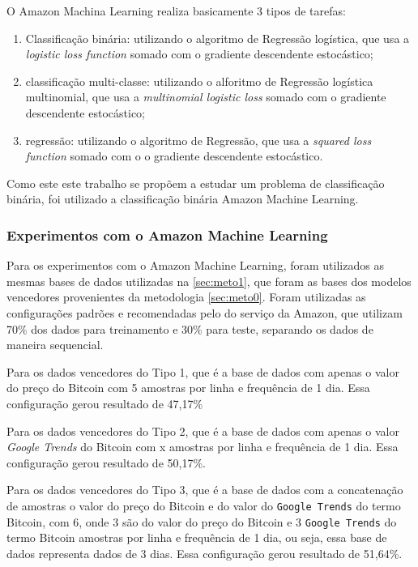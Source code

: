 O Amazon Machina Learning realiza basicamente 3 tipos de tarefas:

\begin{enumerate}
    \item Classificação binária: utilizando o algoritmo de Regressão logística, que usa a \textit{logistic loss function} somado com o gradiente descendente estocástico;
    \item classificação multi-classe: utilizando o alforitmo de Regressão logística multinomial, que usa a \textit{multinomial logistic loss} somado com o gradiente descendente estocástico;
    \item regressão: utilizando o algoritmo de Regressão, que usa a \textit{squared loss function} somado com o o gradiente descendente estocástico.
\end{enumerate}

Como este este trabalho se propõem a estudar um problema de classificação binária, foi utilizado a classificação binária Amazon Machine Learning. 

\subsubsection{Experimentos com o Amazon Machine Learning}

Para os experimentos com o Amazon Machine Learning, foram utilizados as mesmas bases de dados utilizadas na \ref{sec:meto1}, que foram as bases dos modelos vencedores provenientes da metodologia \ref{sec:meto0}. Foram utilizadas as configurações padrões e recomendadas pelo do serviço da Amazon, que utilizam 70\% dos dados para treinamento e 30\% para teste, separando os dados de maneira sequencial.

Para os dados vencedores do Tipo 1, que é a base de dados com apenas o valor do preço do Bitcoin com 5 amostras por linha e frequência de 1 dia. Essa configuração gerou resultado de 47,17\% 

Para os dados vencedores do Tipo 2, que é a base de dados com apenas o valor \textit{Google Trends} do Bitcoin com x amostras por linha e frequência de 1 dia. Essa configuração gerou resultado de 50,17\%.

Para os dados vencedores do Tipo 3, que é a base de dados com a concatenação de amostras o valor do preço do Bitcoin e do valor do \texttt{Google Trends} do termo Bitcoin, com 6, onde 3 são do valor do preço do Bitcoin e 3 \texttt{Google Trends} do termo Bitcoin amostras por linha e frequência de 1 dia, ou seja, essa base de dados representa dados de 3 dias. Essa configuração gerou resultado de 51,64\%.


